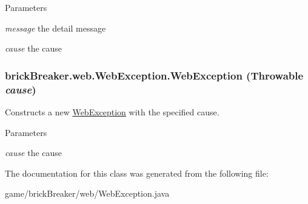 \begin{DoxyParams}{Parameters}
\item[{\em message}]the detail message \item[{\em cause}]the cause \end{DoxyParams}
\hypertarget{classbrick_breaker_1_1web_1_1_web_exception_a0fec67ad1b856715b5c5d9505fa65506}{
\subsubsection[{WebException}]{\setlength{\rightskip}{0pt plus 5cm}brickBreaker.web.WebException.WebException (Throwable {\em cause})}}
\label{classbrick_breaker_1_1web_1_1_web_exception_a0fec67ad1b856715b5c5d9505fa65506}
Constructs a new {\ttfamily \hyperlink{classbrick_breaker_1_1web_1_1_web_exception}{WebException}} with the specified cause.


\begin{DoxyParams}{Parameters}
\item[{\em cause}]the cause \end{DoxyParams}


The documentation for this class was generated from the following file:\begin{DoxyCompactItemize}
\item 
game/brickBreaker/web/WebException.java\end{DoxyCompactItemize}
